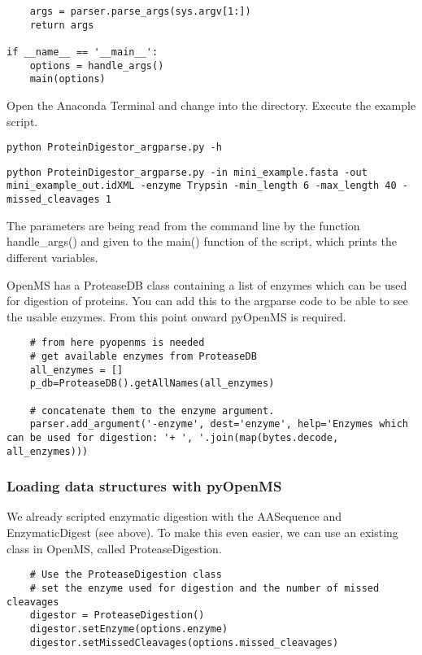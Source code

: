 {\begin{lstlisting}
    args = parser.parse_args(sys.argv[1:])
    return args

if __name__ == '__main__':
    options = handle_args()
    main(options)
\end{lstlisting}

\noindent Open the Anaconda Terminal and change into the  directory. Execute the example script. 
\begin{lstlisting}
python ProteinDigestor_argparse.py -h
\end{lstlisting}

\begin{lstlisting}
python ProteinDigestor_argparse.py -in mini_example.fasta -out mini_example_out.idXML -enzyme Trypsin -min_length 6 -max_length 40 -missed_cleavages 1
\end{lstlisting}

\noindent The parameters are being read from the command line by the function handle\_args() and given to the main() function of the script, which prints the different variables.

\noindent OpenMS has a ProteaseDB  class containing a list of enzymes which can be used for digestion of proteins. You can add this to the argparse code to be able to see the usable enzymes. From this point onward pyOpenMS is required. 
\begin{lstlisting}
    # from here pyopenms is needed
    # get available enzymes from ProteaseDB
    all_enzymes = []
    p_db=ProteaseDB().getAllNames(all_enzymes)
    
    # concatenate them to the enzyme argument.
    parser.add_argument('-enzyme', dest='enzyme', help='Enzymes which can be used for digestion: '+ ', '.join(map(bytes.decode, all_enzymes)))
\end{lstlisting}

\subsubsection{Loading data structures with pyOpenMS}
We already scripted enzymatic digestion with the AASequence and EnzymaticDigest (see above). To make this even easier, we can use an existing class in OpenMS, called ProteaseDigestion.

\begin{lstlisting}
    # Use the ProteaseDigestion class
    # set the enzyme used for digestion and the number of missed cleavages
    digestor = ProteaseDigestion()
    digestor.setEnzyme(options.enzyme)
    digestor.setMissedCleavages(options.missed_cleavages)
    

\end{lstlisting}}
